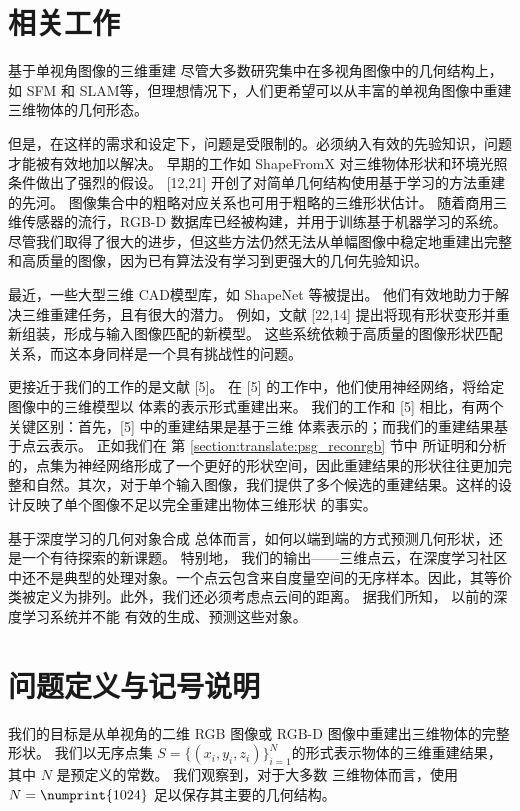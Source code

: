 \section{相关工作}
 {\heiti 基于单视角图像的三维重建}
尽管大多数研究集中在多视角图像中的几何结构上，如 SFM\acite{[11]} 和 SLAM\acite{[10]}等，但理想情况下，人们更希望可以从丰富的单视角图像中重建三维物体的几何形态。

但是，在这样的需求和设定下，问题是受限制的。必须纳入有效的先验知识，问题才能被有效地加以解决。
早期的工作如 ShapeFromX \acite{[13,1]} 对三维物体形状和环境光照条件做出了强烈的假设。
{[12,21]} 开创了对简单几何结构使用基于学习的方法重建的先河。 图像集合中的粗略对应关系也可用于粗略的三维形状估计\acite{[15,3]}。
随着商用三维传感器的流行，RGB-D 数据库已经被构建，并用于训练基于机器学习的系统\acite{[7,9]}。
尽管我们取得了很大的进步，但这些方法仍然无法从单幅图像中稳定地重建出完整和高质量的图像，因为已有算法没有学习到更强大的几何先验知识。

最近，一些大型三维 CAD模型库，如 ShapeNet\acite{[4]} 等被提出。
他们有效地助力于解决三维重建任务，且有很大的潜力。
例如，文献 [22,14] 提出将现有形状变形并重新组装，形成与输入图像匹配的新模型。
这些系统依赖于高质量的图像形状匹配关系，而这本身同样是一个具有挑战性的问题。


更接近于我们的工作的是文献 [5]。
在 [5] 的工作中，他们使用神经网络，将给定图像中的三维模型以 体素的表示形式重建出来。 我们的工作和 [5] 相比，有两个关键区别：首先，[5] 中的重建结果是基于三维 体素表示的；而我们的重建结果基于点云表示。 正如我们在
第 \ref{section:translate:psg_reconrgb} 节中
所证明和分析的，点集为神经网络形成了一个更好的形状空间，因此重建结果的形状往往更加完整和自然。其次，对于单个输入图像，我们提供了多个候选的重建结果。这样的设计反映了单个图像不足以完全重建出物体三维形状
的事实。


{\heiti 基于深度学习的几何对象合成}
总体而言，如何以端到端的方式预测几何形状，还是一个有待探索的新课题。
特别地，%
我们的输出——三维点云，在深度学习社区中还不是典型的处理对象。一个点云包含来自度量空间的无序样本。因此，其等价类被定义为排列。此外，我们还必须考虑点云间的距离。 据我们所知，%
以前的深度学习系统并不能%
有效的生成、预测这些对象。






\section{问题定义与记号说明}
我们的目标是从单视角的二维 RGB 图像或 RGB-D 图像中重建出三维物体的完整形状。
我们以无序点集 $S = \{(x_i, y_i, z_i)\}^N_{i = 1}$的形式表示物体的三维重建结果，其中 $N$ 是预定义的常数。 我们观察到，对于大多数%
三维物体而言，使用  $N = \numprint{1024}$  足以保存其主要的几何结构。

